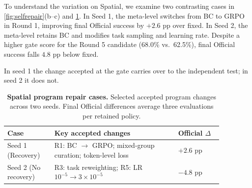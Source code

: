To understand the variation on Spatial, we examine two contrasting
cases in \cref{fig:selfrepair}(b--c) and \cref{tab:selfrepair}.
In Seed 1, the meta-level switches from BC to GRPO in Round 1,
improving final Official success by $+2.6$ pp over fixed.
In Seed 2, the meta-level retains BC and modifies task sampling
and learning rate. Despite a higher gate score for the Round 5
candidate (68.0\% vs.\ 62.5\%), final Official success falls
$4.8$ pp below fixed.

In seed 1 the change accepted at the gate carries over to the independent test; in seed 2 it does not.
\begin{table}[t]
    \centering
    \small
    \caption{\textbf{Spatial program repair cases.}
    Selected accepted program changes across two seeds.
    Final Official differences average three evaluations
    per retained policy.}
    \label{tab:selfrepair}
    \begin{tabular}{@{}p{0.19\linewidth}p{0.50\linewidth}p{0.18\linewidth}@{}}
        \hline
        Case & Key accepted changes & Official $\Delta$ \\
        \hline
        Seed 1
        (Recovery)
        & R1: BC $\to$ GRPO;
        mixed-group curation;
        token-level loss
        & $+2.6$ pp \\

        Seed 2
        (No recovery)
        & R3: task reweighting;
        R5: LR $10^{-5} \to 3\times10^{-5}$
        & $-4.8$ pp \\
        \hline
    \end{tabular}
\end{table}


